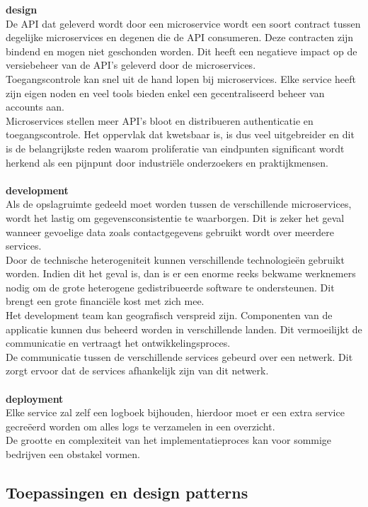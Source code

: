\textbf{design} \\De API dat geleverd wordt door een microservice wordt een soort contract tussen degelijke microservices en degenen die de API consumeren. Deze contracten zijn bindend en mogen niet geschonden worden. Dit heeft een negatieve impact op de versiebeheer van de API's geleverd door de microservices.\\    Toegangscontrole kan snel uit de hand lopen bij microservices. Elke service heeft zijn eigen noden en veel tools bieden enkel een gecentraliseerd beheer van accounts aan.\\    Microservices stellen meer API's bloot en distribueren authenticatie en toegangscontrole. Het oppervlak dat kwetsbaar is, is dus veel uitgebreider en dit is de belangrijkste reden waarom proliferatie van eindpunten significant wordt herkend als een pijnpunt door industriële onderzoekers en praktijkmensen.\\  \\
\textbf{development} \\ Als de opslagruimte gedeeld moet worden tussen de verschillende microservices, wordt het lastig om gegevensconsistentie te waarborgen. Dit is zeker het geval wanneer gevoelige data zoals contactgegevens gebruikt wordt over meerdere services.\\
Door de technische heterogeniteit kunnen verschillende technologieën gebruikt worden. Indien dit het geval is, dan is er een enorme reeks bekwame werknemers nodig om de grote heterogene gedistribueerde software te ondersteunen. Dit brengt een grote financiële kost met zich mee.\\
Het development team kan geografisch verspreid zijn. Componenten van de applicatie kunnen dus beheerd worden in verschillende landen. Dit vermoeilijkt de communicatie en vertraagt het ontwikkelingsproces.\\
De communicatie tussen de verschillende services gebeurd over een netwerk. Dit zorgt ervoor dat de services afhankelijk zijn van dit netwerk.\\ \\
\textbf{deployment} \\ Elke service zal zelf een logboek bijhouden, hierdoor moet er een extra service gecreëerd worden om alles logs te verzamelen in een overzicht.\\
De grootte en complexiteit van het implementatieproces kan voor sommige bedrijven een obstakel vormen.

\subsection{Toepassingen en design patterns}

